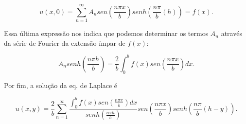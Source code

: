 \documentclass[a4paper,portuguese,9pt,final]{extarticle}
\providecommand{\sin}{} \renewcommand{\sin}{sen}
\begin{document}
\begin{multicols*}{2}
    $$u(x,0) = \sum_{n=1}^{\infty} A_n \sin{(\frac{n\pi x}{b})}senh{(\frac{n\pi}{b} (h))} = f(x).$$

    Essa última expressão nos indica que podemos determinar os termos $A_n$ através da série de Fourier da extensão ímpar de $f(x)$:

    $$A_n senh{(\frac{n\pi h}{b})} = \frac{2}{b} \int_0^{b} f(x) \sin{(\frac{n\pi x}{b})}dx.$$


    Por fim, a solução da eq. de Laplace é

    $$u(x,y) = \frac{2}{b} \sum_{n=1}^{\infty} \frac{\int_0^{b} f(x) \sin{(\frac{n\pi x}{b})}dx}{senh{(\frac{n\pi h}{b})}}\sin{(\frac{n\pi x}{b})}senh{(\frac{n\pi}{b} (h-y))}.$$










\end{multicols*}
\end{document}
